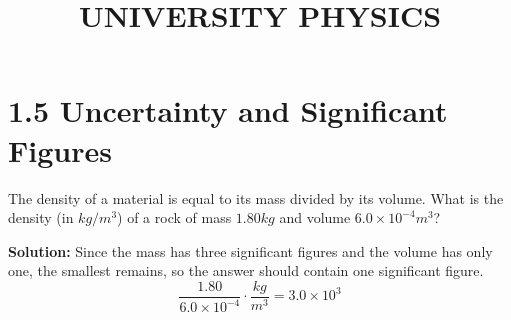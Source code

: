 \title{UNIVERSITY PHYSICS}


\maketitle

\section{1.5 Uncertainty and Significant Figures}

The density of a material is
equal to its mass divided by its volume. What is the density (in $kg/m^3$) of a rock of mass $1.80kg$ and volume $6.0 \times 10^{-4} m^3$?

\textbf{Solution:} Since the mass has three significant figures and the volume has only one, the smallest remains, so the answer should contain one significant figure.
\begin{equation}
    \frac{1.80}{6.0 \times 10^{-4}} \cdot \frac{kg}{m^3} = 3.0 \times 10^3
\end{equation}
